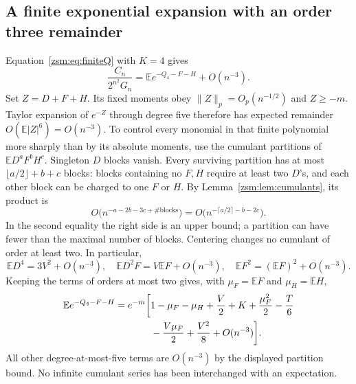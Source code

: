 \documentclass[11pt]{article}
\theoremstyle{definition}\newtheorem{definition}[theorem]{Definition}
\theoremstyle{remark}\newtheorem{remark}[theorem]{Remark}
\newcommand{\E}{\mathbb E}
\begin{document}
\subsection{A finite exponential expansion with an order three remainder}
Equation~\eqref{zsm:eq:finiteQ} with $K=4$ gives
\[
 \frac{C_n}{2^{n^2}G_n}=\E e^{-Q_4-F-H}+O(n^{-3}).
\]
Set $Z=D+F+H$. Its fixed moments obey
$\|Z\|_p=O_p(n^{-1/2})$ and $Z\ge-m$. Taylor expansion of $e^{-Z}$ through
degree five therefore has expected remainder $O(\E|Z|^6)=O(n^{-3})$.
To control every monomial in that finite polynomial more sharply than by its
absolute moments, use the cumulant partitions of $\E D^aF^bH^c$.
Singleton $D$ blocks vanish. Every surviving partition has at most
$\lfloor a/2\rfloor+b+c$ blocks: blocks containing no $F,H$ require at least
two $D$'s, and each other block can be charged to one $F$ or $H$. By
Lemma~\ref{zsm:lem:cumulants}, its product is
\[
 O\bigl(n^{-a-2b-3c+\#\text{blocks}}\bigr)
 =O\bigl(n^{-\lceil a/2\rceil-b-2c}\bigr).
\]
In the second equality the right side is an upper bound; a partition can have
fewer than the maximal number of blocks. Centering changes no cumulant of
order at least two. In particular,
\[
 \E D^4=3V^2+O(n^{-3}),\quad
 \E D^2F=V\E F+O(n^{-3}),\quad
 \E F^2=(\E F)^2+O(n^{-3}).
\]
Keeping the terms of orders at most two gives, with $\mu_F=\E F$ and
$\mu_H=\E H$,
\begin{align}
 \E e^{-Q_4-F-H}=e^{-m}\bigg[&1-\mu_F-\mu_H+\frac V2+K+
 \frac{\mu_F^2}2-\frac T6\notag\\
 &-\frac{V\mu_F}2+\frac{V^2}8+O(n^{-3})\bigg].\label{zsm:eq:secondexp}
\end{align}
All other degree-at-most-five terms are $O(n^{-3})$ by the displayed partition
bound. No infinite cumulant series has been interchanged with an expectation.
\end{document}
